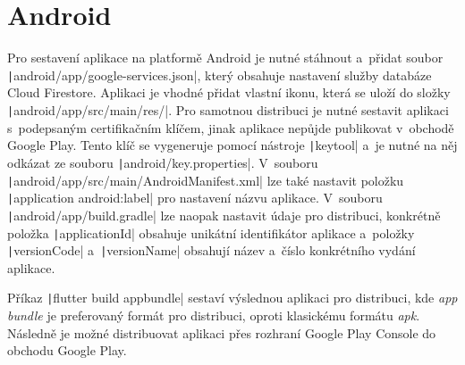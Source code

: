 \section{Android}

Pro sestavení aplikace na platformě Android je nutné stáhnout a~přidat soubor
\texttt|android/app/google-services.json|,
který obsahuje nastavení služby databáze Cloud Firestore.
Aplikaci je vhodné přidat vlastní ikonu,
která se uloží do složky \texttt|android/app/src/main/res/|.
Pro samotnou distribuci je nutné sestavit aplikaci
s~podepsaným certifikačním klíčem,
jinak aplikace nepůjde publikovat v~obchodě Google Play. 
Tento klíč se vygeneruje pomocí nástroje \texttt|keytool|
a~je nutné na něj odkázat ze souboru \texttt|android/key.properties|.
V~souboru
\texttt|android/app/src/main/AndroidManifest.xml|
lze také nastavit položku
\texttt|application android:label|
pro nastavení názvu aplikace.
V~souboru
\texttt|android/app/build.gradle|
lze naopak nastavit údaje pro distribuci,
konkrétně položka \texttt|applicationId|
obsahuje unikátní identifikátor aplikace
a~položky \texttt|versionCode| a~\texttt|versionName|
obsahují název
a~číslo konkrétního vydání aplikace.~\cite{flutter_deploy_android}

Příkaz \texttt|flutter build appbundle| sestaví výslednou aplikaci
pro distribuci,
kde \emph{app bundle} je preferovaný formát pro distribuci,
oproti klasickému formátu \emph{apk}.
Následně je možné distribuovat aplikaci přes rozhraní Google Play Console
do obchodu Google Play.
